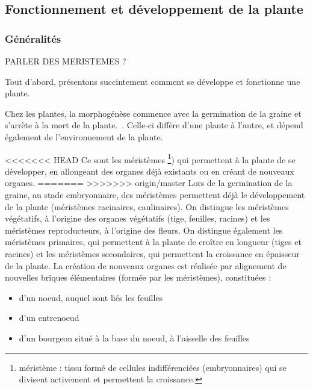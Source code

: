 \subsection{Fonctionnement et développement de la plante}

\subsubsection{Généralités}

PARLER DES MERISTEMES ?

Tout d'abord, présentons succintement comment se développe et fonctionne une plante. 

Chez les plantes, la morphogénèse commence avec la germination de la graine et s'arrète à la mort de la plante.~\cite[p.~22]{these_modelisation}.
Celle-ci diffère d'une plante à l'autre, et dépend également de l'environnement de la plante.

<<<<<<< HEAD
Ce sont les méristèmes \footnote{méristème : tissu formé de cellules indifférenciées (embryonnaires) qui se divisent activement et permettent la croissance.}) qui permettent à la plante de se développer, en allongeant des organes déjà existants ou en créant de nouveaux organes.
=======
>>>>>>> origin/master
Lors de la germination de la graine, au stade embryonnaire, des méristèmes permettent déjà le développement de la plante (méristèmes racinaires, caulinaires).
On distingue les méristèmes végétatifs, à l’origine des organes végétatifs (tige, feuilles, racines) et les méristèmes reproducteurs, à l’origine des fleurs.
On distingue également les méristèmes primaires, qui permettent à la plante de croître en longueur (tiges et racines) et les méristèmes secondaires, qui permettent la croissance en épaisseur de la plante.
La création de nouveaux organes est réalisée par alignement de nouvelles briques élémentaires (formée par les méristèmes), constituées :
\begin{itemize}
	\item d'un noeud, auquel sont liés les feuilles
	\item d'un entrenoeud 
	\item d'un bourgeon situé à la base du noeud, à l'aisselle des feuilles
\end{itemize} 




